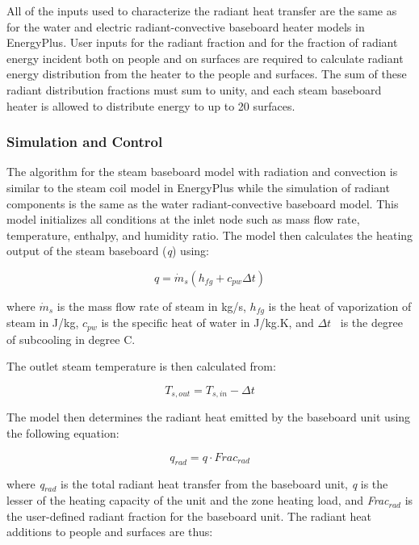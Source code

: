 All of the inputs used to characterize the radiant heat transfer are the same as for the water and electric radiant-convective baseboard heater models in EnergyPlus. User inputs for the radiant fraction and for the fraction of radiant energy incident both on people and on surfaces are required to calculate radiant energy distribution from the heater to the people and surfaces. The sum of these radiant distribution fractions must sum to unity, and each steam baseboard heater is allowed to distribute energy to up to 20 surfaces.

\subsubsection{Simulation and Control}\label{simulation-and-control-1-001}

The algorithm for the steam baseboard model with radiation and convection is similar to the steam coil model in EnergyPlus while the simulation of radiant components is the same as the water radiant-convective baseboard model. This model initializes all conditions at the inlet node such as mass flow rate, temperature, enthalpy, and humidity ratio. The model then calculates the heating output of the steam baseboard (\emph{q}) using:

\begin{equation}
q = {\dot m_s}({h_{fg}} + {c_{pw}}\Delta t)
\end{equation}

where \({\dot m_s}\) is the mass flow rate of steam in kg/s, \({h_{fg}}\) is the heat of vaporization of steam in J/kg, \({c_{pw}}\) is the specific heat of water in J/kg.K, and \(\Delta t\) ~is the degree of subcooling in degree C.

The outlet steam temperature is then calculated from:

\begin{equation}
{T_{s,out}} = {T_{s,in}} - \Delta t
\end{equation}

The model then determines the radiant heat emitted by the baseboard unit using the following equation:

\begin{equation}
{q_{rad}} = q \cdot Fra{c_{rad}}
\end{equation}

where \emph{q\(_{rad}\)} is the total radiant heat transfer from the baseboard unit, \emph{q} is the lesser of the heating capacity of the unit and the zone heating load, and \emph{Frac\(_{rad}\)} is the user-defined radiant fraction for the baseboard unit. The radiant heat additions to people and surfaces are thus:

